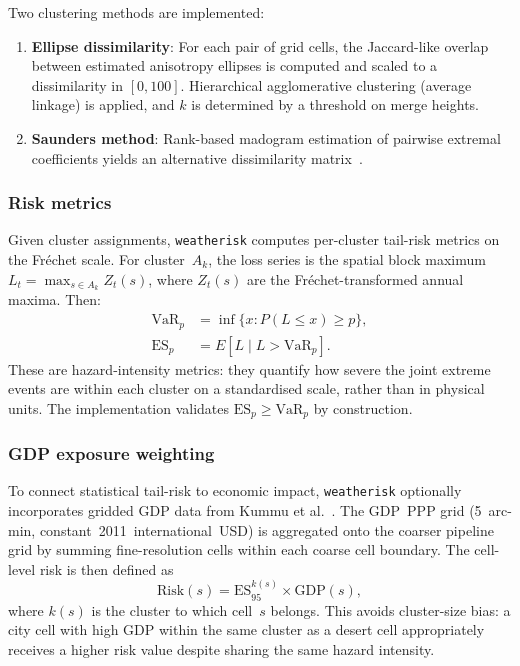 \documentclass[a4paper]{elsarticle}
\begin{document}
Two clustering methods are implemented:
\begin{enumerate}
\item \textbf{Ellipse dissimilarity}: For each pair of grid cells, the
  Jaccard-like overlap between estimated anisotropy ellipses is computed
  and scaled to a dissimilarity in $[0, 100]$. Hierarchical agglomerative
  clustering (average linkage) is applied, and $k$ is determined by a
  threshold on merge heights.
\item \textbf{Saunders method}: Rank-based madogram estimation of pairwise
  extremal coefficients yields an alternative dissimilarity
  matrix~\cite{saunders2021,cooley2006}.
\end{enumerate}

\subsubsection{Risk metrics}

Given cluster assignments, \texttt{weatherisk} computes per-cluster
tail-risk metrics on the Fr\'{e}chet scale.
For cluster~$A_k$, the loss series is the spatial block maximum
$L_t = \max_{s \in A_k} Z_t(s)$, where $Z_t(s)$ are the Fr\'{e}chet-transformed
annual maxima.  Then:
\begin{align}
  \mathrm{VaR}_p &= \inf\{x : P(L \leq x) \geq p\}, \label{eq:var} \\
  \mathrm{ES}_p  &= E[L \mid L > \mathrm{VaR}_p]. \label{eq:es}
\end{align}
These are hazard-intensity metrics: they quantify how severe the joint
extreme events are within each cluster on a standardised scale, rather
than in physical units.
The implementation validates $\mathrm{ES}_p \geq \mathrm{VaR}_p$
by construction.

\subsubsection{GDP exposure weighting}
\label{sec:gdp}

To connect statistical tail-risk to economic impact, \texttt{weatherisk}
optionally incorporates gridded GDP data from Kummu et al.~\cite{kummu2018}.
The GDP~PPP grid (5~arc-min, constant~2011~international~USD) is aggregated
onto the coarser pipeline grid by summing fine-resolution cells within
each coarse cell boundary.
The cell-level risk is then defined as
\begin{equation}\label{eq:risk-gdp}
  \mathrm{Risk}(s) = \mathrm{ES}_{95}^{k(s)} \times \mathrm{GDP}(s),
\end{equation}
where $k(s)$ is the cluster to which cell~$s$ belongs.
This avoids cluster-size bias: a city cell with high GDP within the
same cluster as a desert cell appropriately receives a higher risk
value despite sharing the same hazard intensity.
\end{document}
